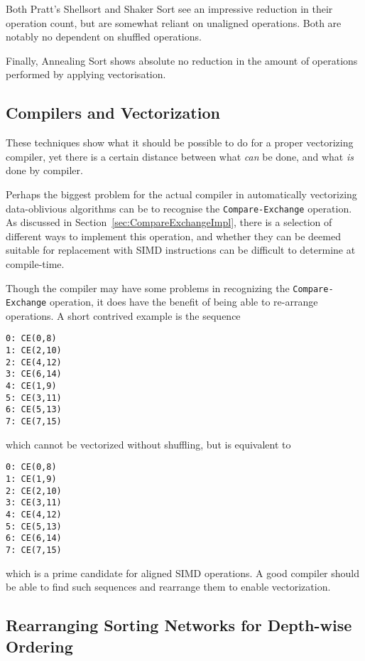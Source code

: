 Both Pratt's Shellsort and Shaker Sort see an impressive reduction in their operation count, but are somewhat reliant on unaligned operations. Both are notably no dependent on shuffled operations.

Finally, Annealing Sort shows absolute no reduction in the amount of operations performed by applying vectorisation.

\subsection{Compilers and Vectorization}

These techniques show what it should be possible to do for a proper vectorizing compiler, yet there is a certain distance between what \emph{can} be done, and what \emph{is} done by compiler.

Perhaps the biggest problem for the actual compiler in automatically vectorizing data-oblivious algorithms can be to recognise the \texttt{Compare-Exchange} operation. As discussed in Section~\ref{sec:CompareExchangeImpl}, there is a selection of different ways to implement this operation, and whether they can be deemed suitable for replacement with SIMD instructions can be difficult to determine at compile-time.

Though the compiler may have some problems in recognizing the \texttt{Compare-Exchange} operation, it does have the benefit of being able to re-arrange operations. A short contrived example is the sequence 
\begin{multicols}{2}
\begin{verbatim}
0: CE(0,8)
1: CE(2,10)
2: CE(4,12)
3: CE(6,14)
4: CE(1,9)
5: CE(3,11)
6: CE(5,13)
7: CE(7,15)
\end{verbatim}
\end{multicols}

\noindent
which cannot be vectorized without shuffling, but is equivalent to 

\begin{multicols}{2}
\begin{verbatim}
0: CE(0,8)
1: CE(1,9)
2: CE(2,10)
3: CE(3,11)
4: CE(4,12)
5: CE(5,13)
6: CE(6,14)
7: CE(7,15)
\end{verbatim}
\end{multicols}

\noindent
which is a prime candidate for aligned SIMD operations. A good compiler should be able to find such sequences and rearrange them to enable vectorization.

\subsection{Rearranging Sorting Networks for Depth-wise Ordering}

